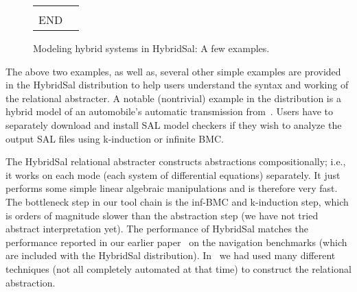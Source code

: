 \documentclass{llncs}
\begin{document}
\begin{figure}[htb!]
\begin{tt}
\begin{tabular}{ll}
\begin{minipage}{2in}
\begin{tabbing}
%
%
\\
END
\end{tabbing}
\end{minipage}
\end{tabular}
\end{tt}
\caption{Modeling hybrid systems in HybridSal: A few examples.}
\label{fig:ex}
\end{figure}

The above two examples, as well as,
several other simple examples are provided in the
HybridSal distribution to help
users understand the syntax and working of the
relational abstracter.  
A notable (nontrivial) example in the distribution is a hybrid
model of an automobile's automatic transmission from~\cite{ChutinanButts02:Mobies}.
Users have to separately
download and install SAL model checkers if they
wish to analyze the output SAL files using
k-induction or infinite BMC.

The HybridSal relational abstracter constructs abstractions
compositionally; i.e., it works on each mode 
(each system of differential equations) separately.
It just performs some simple linear algebraic manipulations
and is therefore very fast.  
The bottleneck step in our tool chain
is the inf-BMC and k-induction step,
which is orders of magnitude slower than the abstraction step
(we have not tried abstract interpretation yet).
The performance of HybridSal matches the performance reported 
in our earlier paper~\cite{ST11:CAVsmall} on the navigation
benchmarks (which are included with the HybridSal distribution).
In~\cite{ST11:CAVsmall} we had used many
different techniques (not all completely automated at that time)
to construct the relational abstraction.



%
\end{document}
